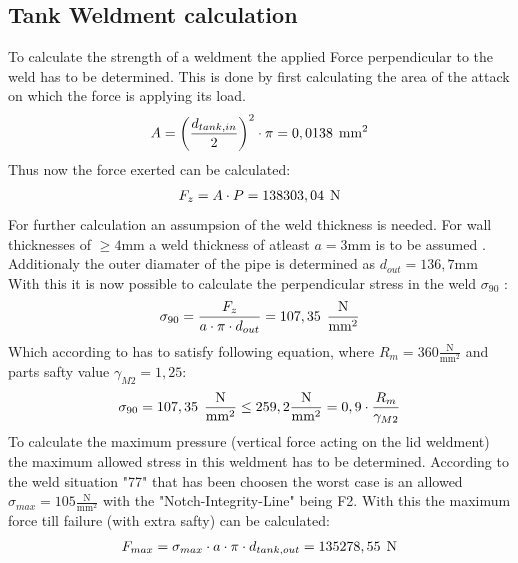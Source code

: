\subsection{Tank Weldment calculation}
To calculate the strength of a weldment the applied Force perpendicular to the weld has to be determined. This is done by first calculating the area of the attack on which the force is applying its load.
\begin{gather}
    A = \left( \frac{d_{tank,in}}{2} \right)^2 \cdot \pi = 0,0138 \hspace{1ex} \text{mm}^2
\end{gather}
Thus now the force exerted can be calculated:
\begin{gather}
    F_z = A \cdot P = 138303,04 \hspace{1ex} \text{N}
\end{gather}
For further calculation an assumpsion of the weld thickness is needed. For wall thicknesses of $\geq 4 \text{mm}$ a weld thickness of atleast $a = 3 \text{mm}$ is to be assumed \cite[Eq. 6.17a, P. 176]{roloff}. Additionaly the outer diamater of the pipe is determined as $d_{out} = 136,7 \text{mm}$
With this it is now possible to calculate the perpendicular stress in the weld $\sigma_{90}$ \cite[Pic. 6.46, P. 186]{roloff}:
\begin{gather}
    \sigma_{90} = \frac{F_z}{a \cdot \pi \cdot d_{out}} = 107,35 \hspace{1ex} \frac{\text{N}}{\text{mm}^2}
\end{gather}
Which according to \cite[Eq. 6.19, P. 179]{roloff} has to satisfy following equation, where $R_m = 360 \frac{\text{N}}{\text{mm}^2}$ and parts safty value $\gamma_{M2} = 1,25$:
\begin{gather}
    \sigma_{90} = 107,35 \hspace{1ex} \frac{\text{N}}{\text{mm}^2} \leq 259,2 \frac{\text{N}}{\text{mm}^2} = 0,9 \cdot \frac{R_m}{\gamma_{M2}}
\end{gather}
To calculate the maximum pressure (vertical force acting on the lid weldment) the maximum allowed stress in this weldment has to be determined. According to the weld situation "77" that has been choosen the worst case is an allowed $\sigma_{max} = 105 \frac{\text{N}}{\text{mm}^2}$ with the "Notch-Integrity-Line" being F2\cite[Tab. 6-11, 6-12]{roloff}. With this the maximum force till failure (with extra safty) can be calculated:
\begin{gather}
    F_{max} = \sigma_{max} \cdot a \cdot \pi \cdot d_{tank,out} = 135278,55 \hspace{1ex} \text{N}
\end{gather}

